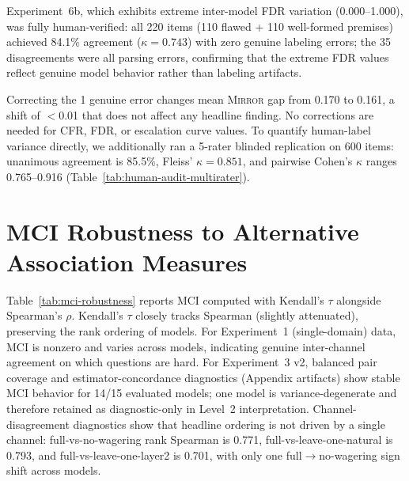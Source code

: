 \documentclass[10pt]{article}
\newcommand{\mirror}{\textsc{Mirror}}
\newcommand{\CFR}{CFR}
\newcommand{\FDR}{FDR}
\begin{document}
Experiment~6b, which exhibits extreme inter-model FDR variation (0.000--1.000),
was fully human-verified: all 220 items (110 flawed + 110 well-formed premises)
achieved 84.1\% agreement ($\kappa = 0.743$) with zero genuine labeling errors; the 35 disagreements
were all parsing errors, confirming that the extreme FDR values
reflect genuine model behavior rather than labeling artifacts.

Correcting the 1 genuine error changes mean \mirror{} gap from 0.170 to 0.161,
a shift of $<$0.01 that does not affect any headline finding. No corrections are
needed for \CFR{}, \FDR{}, or escalation curve values. To quantify human-label
variance directly, we additionally ran a 5-rater blinded replication on 600
items: unanimous agreement is 85.5\%, Fleiss' $\kappa=0.851$, and pairwise
Cohen's $\kappa$ ranges 0.765--0.916 (Table~\ref{tab:human-audit-multirater}).

\section{MCI Robustness to Alternative Association Measures}
\label{app:mci-robust}

Table~\ref{tab:mci-robustness} reports MCI computed with Kendall's $\tau$ alongside Spearman's $\rho$. Kendall's $\tau$ closely tracks Spearman (slightly attenuated), preserving the rank ordering of models. For Experiment~1 (single-domain) data, MCI is nonzero and varies across models, indicating genuine inter-channel agreement on which questions are hard. For Experiment~3 v2, balanced pair coverage and estimator-concordance diagnostics (Appendix artifacts) show stable MCI behavior for 14/15 evaluated models; one model is variance-degenerate and therefore retained as diagnostic-only in Level~2 interpretation. Channel-disagreement diagnostics show that headline ordering is not driven by a single channel: full-vs-no-wagering rank Spearman is 0.771, full-vs-leave-one-natural is 0.793, and full-vs-leave-one-layer2 is 0.701, with only one full$\rightarrow$no-wagering sign shift across models.
\end{document}
